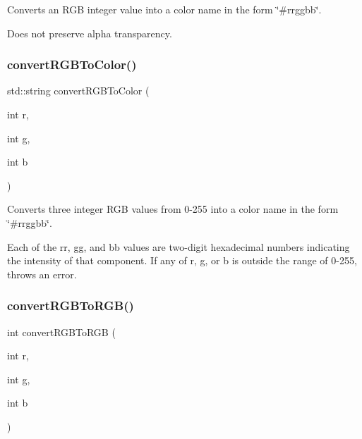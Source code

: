 Converts an R\+GB integer value into a color name in the form {\ttfamily \char`\"{}\#rrggbb\char`\"{}}. 

Does not preserve alpha transparency. \mbox{\label{classGColor_a906729a293e62f8d112037016af21f9f}} 
\subsubsection{\texorpdfstring{convert\+R\+G\+B\+To\+Color()}{convertRGBToColor()}\hspace{0.1cm}{\footnotesize\ttfamily [2/2]}}
{\footnotesize\ttfamily std\+::string convert\+R\+G\+B\+To\+Color (\begin{DoxyParamCaption}\item[{int}]{r,  }\item[{int}]{g,  }\item[{int}]{b }\end{DoxyParamCaption})\hspace{0.3cm}{\ttfamily [static]}}



Converts three integer R\+GB values from 0-\/255 into a color name in the form {\ttfamily \char`\"{}\#rrggbb\char`\"{}}. 

Each of the {\ttfamily rr}, {\ttfamily gg}, and {\ttfamily bb} values are two-\/digit hexadecimal numbers indicating the intensity of that component. If any of r, g, or b is outside the range of 0-\/255, throws an error. \mbox{\label{classGColor_a7c4acb134cfa913f8a127b300a4b10a0}} 
\subsubsection{\texorpdfstring{convert\+R\+G\+B\+To\+R\+G\+B()}{convertRGBToRGB()}}
{\footnotesize\ttfamily int convert\+R\+G\+B\+To\+R\+GB (\begin{DoxyParamCaption}\item[{int}]{r,  }\item[{int}]{g,  }\item[{int}]{b }\end{DoxyParamCaption})\hspace{0.3cm}{\ttfamily [static]}}



